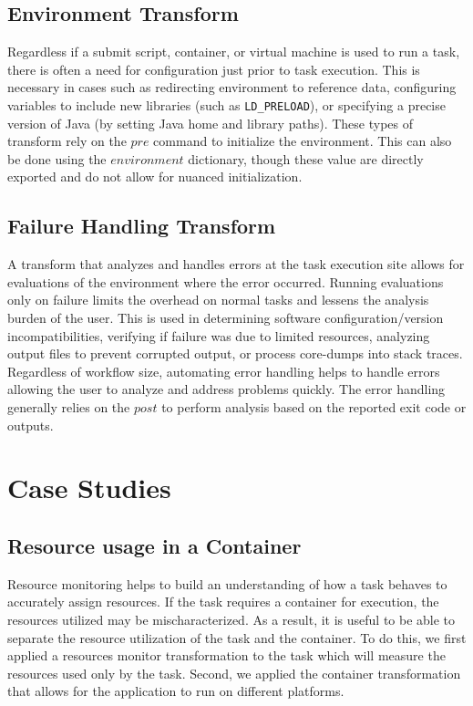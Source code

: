\documentclass[conference]{IEEEtran}
\begin{document}
\subsection{Environment Transform}

Regardless if a submit script, 
container, or virtual machine 
is used to run a task, 
there is often a need for configuration 
just prior to task execution. 
This is necessary in cases such as
redirecting environment to reference data,
configuring variables to include new libraries
(such as {\tt LD\_PRELOAD}),
or specifying a precise version of Java
(by setting Java home and library paths).
These types of transform rely on the 
${pre}$ command to initialize the environment. 
This can also be done using
the ${environment}$ dictionary, though these
value are directly exported and do not 
allow for nuanced initialization.

\subsection{Failure Handling Transform}

A transform that analyzes and handles errors at the task execution site
allows for evaluations of the environment where the error occurred.
Running evaluations only on failure limits the overhead 
on normal tasks and lessens the analysis burden of the user.
This is used in 
determining software configuration/version incompatibilities, 
verifying if failure was due to limited resources, 
analyzing output files to prevent corrupted output,
or process core-dumps into stack traces. 
Regardless of workflow size,
automating error handling helps to handle errors
allowing the user to analyze and address problems quickly. 
The error handling generally relies on the $post$ to 
perform analysis based on the reported
exit code or outputs.

\section{Case Studies}


\subsection{Resource usage in a Container}
Resource monitoring helps to build an understanding of how
a task behaves to accurately assign resources. 
If the task requires a container for execution, the 
resources utilized may be mischaracterized. 
As a result, it is useful to be able to separate the
resource utilization of the task and the container.
To do this, we first applied a 
resources monitor transformation to the task
which will measure the resources used only
by the task.
Second, we applied the container transformation
that allows for the application to run on 
different platforms.
\end{document}
